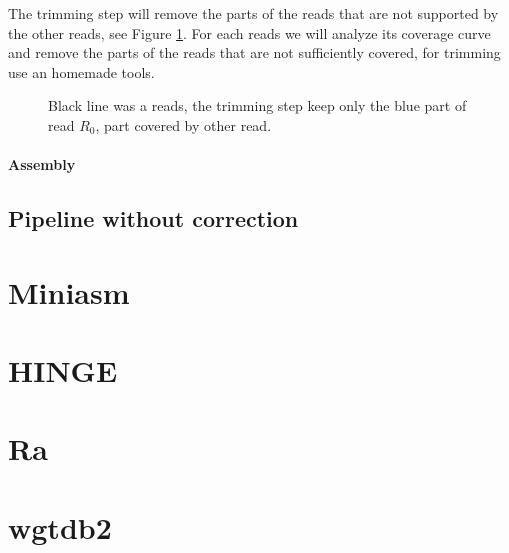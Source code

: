 \documentclass[main]{subfiles}
\begin{document}
The trimming step will remove the parts of the reads that are not supported by the other reads, see Figure \ref{sota:fig:canu:trimming}. For each reads we will analyze its coverage curve and remove the parts of the reads that are not sufficiently covered, for trimming \canu use an homemade tools.


\begin{figure}[ht]
    \centering
    
    \caption{Black line was a reads, the \canu trimming step keep only the blue part of read $R_0$, part covered by other read.}
    \label{sota:fig:canu:trimming}
\end{figure}

\paragraph{Assembly}


\subsection{Pipeline without correction}

\section{Miniasm}

\section{HINGE}

\section{Ra}

\section{wgtdb2}

\end{document}
